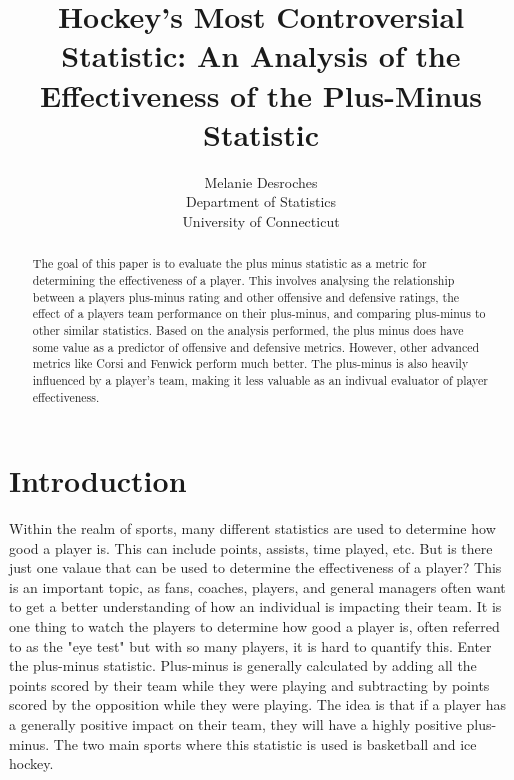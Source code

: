 \documentclass[12pt]{article}
\title{Hockey's Most Controversial Statistic: An Analysis of the Effectiveness of the Plus-Minus Statistic}
\author{Melanie Desroches\\
  Department of Statistics\\
  University of Connecticut
}
\begin{document}
\maketitle

\begin{abstract}
The goal of this paper is to evaluate the plus minus statistic as a metric for determining the effectiveness of a player.
This involves analysing the relationship between a players plus-minus rating and other offensive and defensive ratings,
the effect of a players team performance on their plus-minus, and comparing plus-minus to other similar statistics. Based
on the analysis performed, the plus minus does have some value as a predictor of offensive and defensive metrics. However, other
advanced metrics like Corsi and Fenwick perform much better. The plus-minus is also heavily influenced by a player's team, making it 
less valuable as an indivual evaluator of player effectiveness.
\end{abstract}

\doublespacing

\section{Introduction}
\label{sec:intro}


Within the realm of sports, many different statistics are used to determine how good a player is. This can include points,
assists, time played, etc. But is there just one valaue that can be used to determine the effectiveness of a player? This is an 
important topic, as fans, coaches, players, and general managers often want to get a better understanding of how an individual is
impacting their team. It is one thing to watch the players to determine how good a player is, often referred to as the "eye test" but 
with so many players, it is hard to quantify this. Enter the plus-minus statistic. Plus-minus is generally calculated by adding all the points
scored by their team while they were playing and subtracting by points scored by the opposition while they were playing. The idea is that 
if a player has a generally positive impact on their team, they will have a highly positive plus-minus. The two main sports where this
statistic is used is basketball and ice hockey. 
\end{document}

